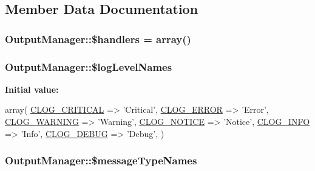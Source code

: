 \subsection{Member Data Documentation}
\hypertarget{classOutputManager_af94e88be35e1f308bb792bb0d229b0ac}{
\subsubsection[{\$handlers}]{\setlength{\rightskip}{0pt plus 5cm}Output\-Manager\-::\$handlers = array()\hspace{0.3cm}{\ttfamily [private]}}}\label{classOutputManager_af94e88be35e1f308bb792bb0d229b0ac}
\hypertarget{classOutputManager_aa2f5c211c92b858d2255068f9e9e29cf}{
\subsubsection[{\$log\-Level\-Names}]{\setlength{\rightskip}{0pt plus 5cm}Output\-Manager\-::\$log\-Level\-Names\hspace{0.3cm}{\ttfamily [static]}}}\label{classOutputManager_aa2f5c211c92b858d2255068f9e9e29cf}
{\bfseries Initial value\-:}
\begin{DoxyCode}
 array(
    \hyperlink{group__log__levels_ga9e72f6a54bb75da33d3d8a8409cb9653}{CLOG\_CRITICAL} => \textcolor{stringliteral}{'Critical'},
    \hyperlink{group__log__levels_gacd8b449d24550e76fa0b9682e816da94}{CLOG\_ERROR} => \textcolor{stringliteral}{'Error'},
    \hyperlink{group__log__levels_ga68940804f97ceabbba29e52e2caf22b9}{CLOG\_WARNING} => \textcolor{stringliteral}{'Warning'},
    \hyperlink{group__log__levels_ga8fe5fb4d67cefbcc5556321a2a1ffaec}{CLOG\_NOTICE} => \textcolor{stringliteral}{'Notice'},
    \hyperlink{group__log__levels_gac0257446453fba0e349b1334d3a6c206}{CLOG\_INFO} => \textcolor{stringliteral}{'Info'},
    \hyperlink{group__log__levels_ga7a20d07461d8da70f7ddccd254222419}{CLOG\_DEBUG} => \textcolor{stringliteral}{'Debug'},
  )
\end{DoxyCode}
\hypertarget{classOutputManager_aeeb86fe276633c99f40c5e660461de09}{
\subsubsection[{\$message\-Type\-Names}]{\setlength{\rightskip}{0pt plus 5cm}Output\-Manager\-::\$message\-Type\-Names\hspace{0.3cm}{\ttfamily [static]}}}\label{classOutputManager_aeeb86fe276633c99f40c5e660461de09}
